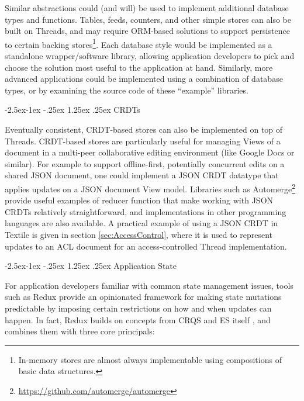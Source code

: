 \documentclass{textile}
\makeatletter
\renewcommand\paragraph{\@startsection{paragraph}{4}{\z@}%
            {-2.5ex\@plus -1ex \@minus -.25ex}%
            {1.25ex \@plus .25ex}%
            {\normalfont\normalsize\itshape}}
\makeatother
\begin{document}
Similar abstractions could (and will) be used to implement additional database types and functions. Tables, feeds, counters, and other simple stores can also be built on Threads, and may require ORM-based solutions to support persistence to certain backing stores\footnote{In-memory stores are almost always implementable using compositions of basic data structures.}. Each database style would be implemented as a standalone wrapper/software library, allowing application developers to pick and choose the solution most useful to the application at hand. Similarly, more advanced applications could be implemented using a combination of database types, or by examining the source code of these ``example'' libraries.

\paragraph{CRDTs} \label{sec:TexCRDT}

Eventually consistent, CRDT-based stores can also be implemented on top of Threads. CRDT-based stores are particularly useful for managing Views of a document in a multi-peer collaborative editing environment (like Google Docs or similar). For example to support offline-first, potentially concurrent edits on a shared JSON document, one could implement a JSON CRDT datatype \cite{kleppmannConflictFreeReplicatedJSON2017} that applies updates on a JSON document View model. Libraries such as Automerge\footnote{\url{https://github.com/automerge/automerge}} provide useful examples of reducer function that make working with JSON CRDTs relatively straightforward, and implementations in other programming languages are also available. A practical example of using a JSON CRDT in Textile is given in section \ref{sec:AccessControl}, where it is used to represent updates to an ACL document for an access-controlled Thread implementation.

\paragraph{Application State}

For application developers familiar with common state management issues, tools such as Redux provide an opinionated framework for making state mutations predictable by imposing certain restrictions on how and when updates can happen. In fact, Redux builds on concepts from CRQS and ES itself \cite{reduxMotivation}, and combines them with three core principals: 
\end{document}
